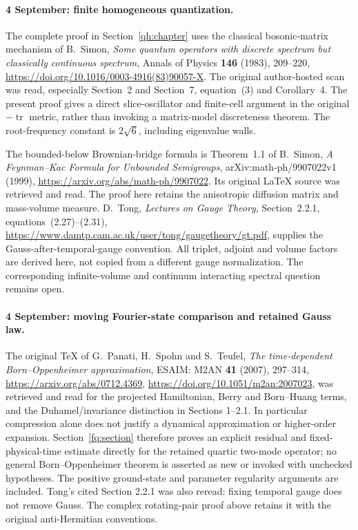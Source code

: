 \paragraph{4 September: finite homogeneous quantization.}
The complete proof in Section~\ref{qh:chapter} uses the classical
bosonic-matrix mechanism of B.~Simon,
\emph{Some quantum operators with discrete spectrum but classically
continuous spectrum}, Annals of Physics \textbf{146} (1983), 209--220,
\url{https://doi.org/10.1016/0003-4916(83)90057-X}.
The original author-hosted scan was read, especially Section~2 and
Section~7, equation~(3) and Corollary~4. The present proof gives a direct
slice-oscillator and finite-cell argument in the original
$-\operatorname{tr}$ metric, rather than invoking a matrix-model
discreteness theorem. The root-frequency constant is $2\sqrt6$,
including eigenvalue walls.

The bounded-below Brownian-bridge formula is Theorem~1.1 of
B.~Simon, \emph{A Feynman--Kac Formula for Unbounded Semigroups},
arXiv:math-ph/9907022v1 (1999),
\url{https://arxiv.org/abs/math-ph/9907022}.
Its original LaTeX source was retrieved and read. The proof here
retains the anisotropic diffusion matrix and mass-volume measure.
D.~Tong, \emph{Lectures on Gauge Theory}, Section~2.2.1,
equations~(2.27)--(2.31),
\url{https://www.damtp.cam.ac.uk/user/tong/gaugetheory/gt.pdf},
supplies the Gauss-after-temporal-gauge convention. All triplet,
adjoint and volume factors are derived here, not copied from a
different gauge normalization. The corresponding infinite-volume
and continuum interacting spectral question remains open.

\paragraph{4 September: moving Fourier-state comparison and retained Gauss law.}
The original TeX of G.~Panati, H.~Spohn and S.~Teufel,
\emph{The time-dependent Born--Oppenheimer approximation},
ESAIM: M2AN \textbf{41} (2007), 297--314,
\url{https://arxiv.org/abs/0712.4369},
\url{https://doi.org/10.1051/m2an:2007023}, was retrieved and read
for the projected Hamiltonian, Berry and Born--Huang terms, and the
Duhamel/invariance distinction in Sections 1--2.1.
In particular compression alone does not justify a dynamical
approximation or higher-order expansion. Section~\ref{fq:section}
therefore proves an explicit residual and fixed-physical-time estimate
directly for the retained quartic two-mode operator; no general
Born--Oppenheimer theorem is asserted as new or invoked with unchecked
hypotheses. The positive ground-state and parameter regularity
arguments are included. Tong's cited Section 2.2.1 was also reread:
fixing temporal gauge does not remove Gauss. The complex rotating-pair
proof above retains it with the original anti-Hermitian conventions.

